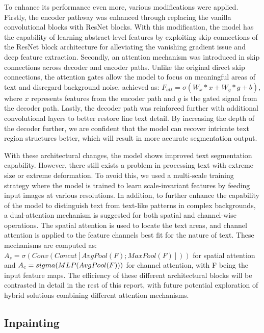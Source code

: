 \documentclass[10pt,twocolumn,letterpaper]{article}
\begin{document}
To enhance its performance even more, various modifications were applied. Firstly, the encoder pathway was enhanced through replacing 
the vanilla convolutional blocks with ResNet blocks. With this modification, the model has the capability of learning abstract-level features 
by exploiting skip connections of the ResNet block architecture for alleviating the vanishing gradient issue and deep feature extraction. 
Secondly, an attention mechanism was introduced in skip connections across decoder and encoder paths. Unlike the original direct skip connections, 
the attention gates allow the model to focus on meaningful areas of text and disregard background noise, 
achieved as: $F_{att} = \sigma(W_x * x + W_g * g + b)$, where $x$ represents features from the encoder path and $g$ is the gated signal from the decoder path. 
Lastly, the decoder path was reinforced further with additional convolutional layers to better restore fine text detail. 
By increasing the depth of the decoder further, we are confident that the model can recover intricate text region structures better, 
which will result in more accurate segmentation output.

With these architectural changes, the model shows improved text segmentation capability. However, there still exists a problem 
in processing text with extreme size or extreme deformation. To avoid this, we used a multi-scale training strategy where the model is trained 
to learn scale-invariant features by feeding input images at various resolutions. In addition, to further enhance the capability of the model 
to distinguish text from text-like patterns in complex backgrounds, a dual-attention mechanism is suggested for both spatial and channel-wise operations. 
The spatial attention is used to locate the text areas, and channel attention is applied to the feature channels best fit for the nature of text. 
These mechanisms are computed as: $A_s = \sigma(Conv(Concat[AvgPool(F); MaxPool(F)]))$ for spatial attention and $A_c = \\sigma(MLP(AvgPool(F)))$ 
for channel attention, with F being the input feature maps. The efficiency of these different architectural blocks will be contrasted 
in detail in the rest of this report, with future potential exploration of hybrid solutions combining different attention mechanisms.

\subsection{Inpainting}
\end{document}
